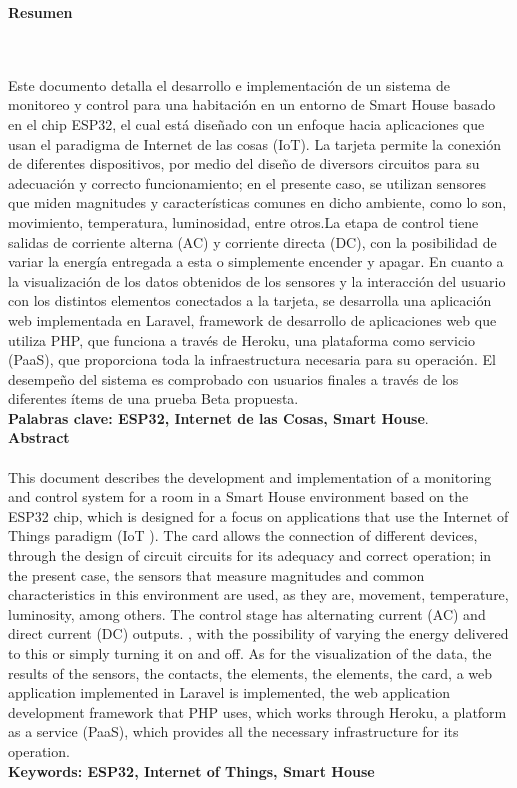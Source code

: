 \newpage
\thispagestyle{empty} \textbf{}\normalsize
\textbf{\LARGE Resumen}
\markboth{}{}
\\\\
 Este documento detalla el desarrollo e implementación de un sistema de monitoreo y control para una habitación en un entorno de Smart House basado en el chip ESP32, el cual está diseñado con un enfoque hacia aplicaciones que usan el paradigma de Internet de las cosas (IoT). La tarjeta permite la conexión de diferentes dispositivos, por medio del diseño de diversors circuitos para su adecuación y correcto funcionamiento; en el presente caso, se utilizan sensores que miden magnitudes y características comunes en dicho ambiente, como lo son, movimiento, temperatura, luminosidad, entre otros.La etapa de control tiene salidas de corriente alterna (AC) y corriente directa (DC), con la posibilidad de variar la energía entregada a esta o simplemente encender y apagar. En cuanto a la visualización de los datos obtenidos de los sensores y la interacción del usuario con los distintos elementos conectados a la tarjeta, se desarrolla una aplicación web implementada en Laravel, framework de desarrollo de aplicaciones web que utiliza PHP, que funciona a través de Heroku, una plataforma como servicio (PaaS), que proporciona toda la infraestructura necesaria para su operación. El desempeño del sistema es comprobado con usuarios finales a través de los diferentes ítems de una prueba Beta propuesta.\\
 
\textbf{\small Palabras clave: ESP32, Internet de las Cosas, Smart House}.\\[1.0cm]

\textbf{\LARGE Abstract}\\\\
This document describes the development and implementation of a monitoring and control system for a room in a Smart House environment based on the ESP32 chip, which is designed for a focus on applications that use the Internet of Things paradigm (IoT ). The card allows the connection of different devices, through the design of circuit circuits for its adequacy and correct operation; in the present case, the sensors that measure magnitudes and common characteristics in this environment are used, as they are, movement, temperature, luminosity, among others. The control stage has alternating current (AC) and direct current (DC) outputs. , with the possibility of varying the energy delivered to this or simply turning it on and off. As for the visualization of the data, the results of the sensors, the contacts, the elements, the elements, the card, a web application implemented in Laravel is implemented, the web application development framework that PHP uses, which works through Heroku, a platform as a service (PaaS), which provides all the necessary infrastructure for its operation.\\

\textbf{\small Keywords: ESP32, Internet of Things, Smart House}